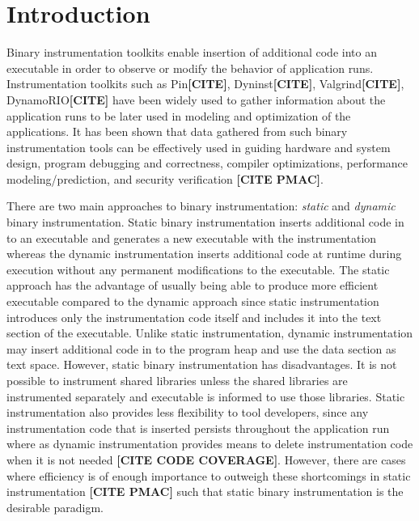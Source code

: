 \section{Introduction}

Binary instrumentation toolkits enable insertion of additional code into an
executable in order to observe or modify the behavior of application runs. 
Instrumentation toolkits such as Pin\textbf{[CITE]}, Dyninst\textbf{[CITE]}, 
Valgrind\textbf{[CITE]}, DynamoRIO\textbf{[CITE]} have been widely used to gather information about the
application runs to be later used in modeling and optimization
of the applications. It has been shown that data gathered 
from such binary instrumentation tools can be effectively used in guiding hardware and
system design, program debugging and correctness, compiler optimizations,
performance modeling/prediction, and security verification \textbf{[CITE PMAC]}.

There are two main approaches to binary instrumentation: \textit{static} 
and \textit{dynamic} binary instrumentation. Static binary
instrumentation inserts additional code in to an executable and generates a new
executable with the instrumentation whereas the dynamic instrumentation inserts additional code 
at runtime during  execution without any permanent modifications to the executable.
 The static approach has the advantage of usually being able to produce
more efficient  executable compared to the dynamic approach
since static instrumentation introduces only the instrumentation code itself 
 and includes it into the text section of the executable. Unlike static instrumentation, dynamic
instrumentation may insert additional code in to the program heap and use the data section as text space.
However, static binary instrumentation has disadvantages. It is not possible to instrument shared libraries 
unless the shared libraries are instrumented separately and executable is informed to use those libraries. 
Static instrumentation also provides less flexibility to tool developers, since any instrumentation code that is
inserted persists throughout the application run where as dynamic instrumentation 
provides means to delete instrumentation code when it is not needed \textbf{[CITE CODE COVERAGE]}.
However, there are cases where efficiency is of enough importance to outweigh
these shortcomings in static instrumentation \textbf{[CITE PMAC]} such that static binary instrumentation is the
desirable paradigm.

